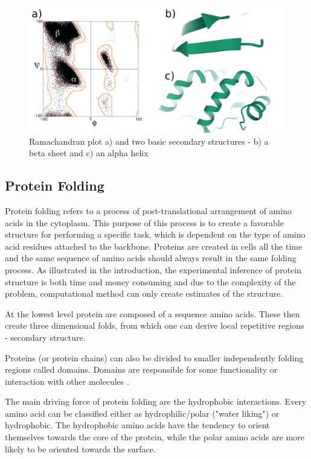 \begin{figure}
    \centering
    \includegraphics[width=\linewidth]{imgs_tomas/secondary.png}
    \caption{Ramachandran plot \cite{ramachandran} a) and two basic secondary structures - b) a beta sheet and c) an alpha helix \cite{pdb}}
    \label{fig:ramachandran}
\end{figure}

\subsection{Protein Folding}

Protein folding refers to a process of post-translational arrangement of amino acids in the cytoplasm. This purpose of this process is to create a favorable structure for performing a specific task, which is dependent on the type of amino acid residues attached to the backbone. Proteins are created in cells all the time and the same sequence of amino acids should always result in the same folding process. As illustrated in the introduction, the experimental inference of protein structure is both time and money consuming and due to the complexity of the problem, computational method can only create estimates of the structure.

At the lowest level protein are composed of a sequence amino acids. These then create three dimensional folds, from which one can derive local repetitive regions - secondary structure. 

Proteins (or protein chains) can also be divided to smaller independently folding regions called domains. Domains are responsible for some functionality or interaction with other molecules \cite{domains}.

The main driving force of protein folding are the hydrophobic interactions. Every amino acid can be classified either as hydrophilic/polar ("water liking") or hydrophobic. The hydrophobic amino acids have the tendency to orient themselves towards the core of the protein, while the polar amino acids are more likely to be oriented towards the surface.

